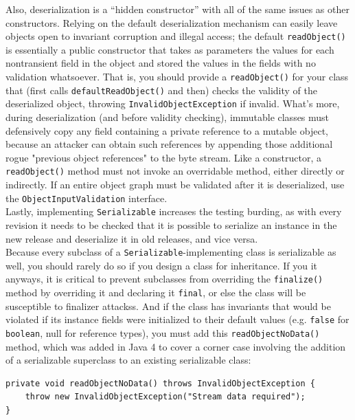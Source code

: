 \documentclass[table, xcdraw]{article}%
\begin{document}
Also, deserialization is a “hidden constructor” with all of the same issues as other constructors. Relying on the default deserialization mechanism can easily leave objects open to invariant corruption and illegal access; the default \texttt{readObject()} is essentially a public constructor that takes as parameters the values for each nontransient field in the object and stored the values in the fields with no validation whatsoever. That is, you should provide a \texttt{readObject()} for your class that (first calls \texttt{defaultReadObject()} and then) checks the validity of the deserialized object, throwing \texttt{InvalidObjectException} if invalid. What's more, during deserialization (and before validity checking), immutable classes must defensively copy any field containing a private reference to a mutable object, because an attacker can obtain such references by appending those additional rogue "previous object references" to the byte stream. Like a constructor, a \texttt{readObject()} method must not invoke an overridable method, either directly or indirectly. If an entire object graph must be validated after it is deserialized, use the \texttt{ObjectInputValidation} interface.\\
Lastly, implementing \texttt{Serializable} increases the testing burding, as with every revision it needs to be checked that it is possible to serialize an instance in the new release and deserialize it in old releases, and vice versa.\\
Because every subclass of a \texttt{Serializable}-implementing class is serializable as well, you should rarely do so if you design a class for inheritance. If you it anyways, it is critical to prevent subclasses from overriding the \texttt{finalize()} method by overriding it and declaring it \texttt{final}, or else the class will be susceptible to finalizer attackss. And if the class has invariants that would be violated if its instance fields were initialized to their default values (e.g. \texttt{false} for \texttt{boolean}, null for reference types), you must add this \texttt{readObjectNoData()} method, which was added in Java 4 to cover a corner case involving the addition of a serializable superclass to an existing serializable class:

\begin{verbatim}
private void readObjectNoData() throws InvalidObjectException {
    throw new InvalidObjectException("Stream data required");
}
\end{verbatim}
\end{document}
